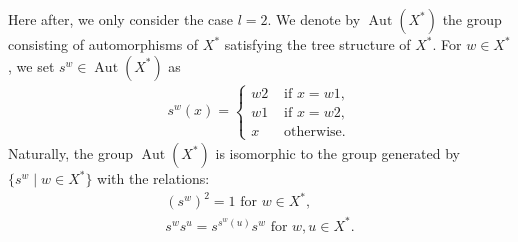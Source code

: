 \documentclass{article}
\theoremstyle{definition}
\theoremstyle{remark}
\numberwithin{equation}{section}
\DeclareMathOperator{\Aut}{Aut}
\numberwithin{equation}{section}
\begin{document}
Here after, we only consider the case $l=2$. We denote by $\Aut(X^*)$ the group consisting of automorphisms of $X^*$ satisfying the tree structure of $X^*$. For $w\in X^*$, we set $s^w\in\Aut(X^*)$ as
\begin{align*}
s^w(x)=\begin{cases}
w2&\text{ if }x=w1,\\
w1&\text{ if }x=w2,\\
x&\text{ otherwise}.
\end{cases}
\end{align*}
Naturally, the group $\Aut(X^*)$ is isomorphic to the group generated by $\{s^w\mid w\in X^*\}$ with the relations:
\begin{gather}
(s^w)^2=1\text{ for }w\in X^*,\label{Aut1}\\
s^ws^u=s^{s^w(u)}s^w\text{ for }w,u\in X^*\label{Aut2}.
\end{gather}
\end{document}
